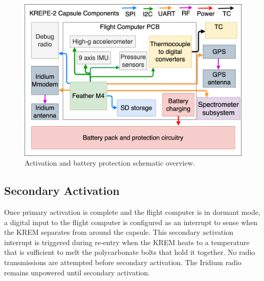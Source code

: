 \documentclass{article}
\begin{document}
\begin{figure}[H]
    \centering
    \includegraphics[width=12cm]{images/krepe2-avionics.png}
    \caption{Activation and battery protection schematic overview.}
    \label{fig:activation-circuitry}
\end{figure}







\subsection{Secondary Activation}
\label{sec:secondary-activation}
Once primary activation is complete and the flight computer is in dormant mode, a digital input to the flight computer is configured as an interrupt to sense when the KREM separates from around the capsule. This secondary activation interrupt is triggered during re-entry when the KREM heats to a temperature that is sufficient to melt the polycarbonate bolts that hold it together. No radio transmissions are attempted before secondary activation. The Iridium radio remains unpowered until secondary activation.




\end{document}
